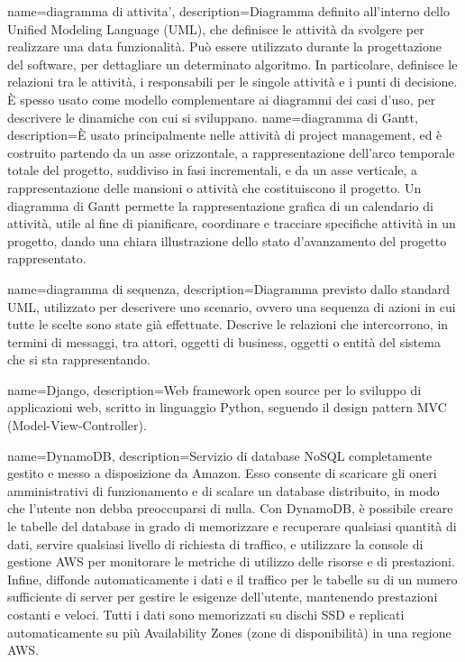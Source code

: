 {
	name=diagramma di attivita',
	description={Diagramma definito all'interno dello Unified Modeling Language (UML), che definisce le attività da svolgere per realizzare una data funzionalità. Può essere utilizzato durante la progettazione del software, per dettagliare un determinato algoritmo. In particolare, definisce le relazioni tra le attività, i responsabili per le singole attività e i punti di decisione. \MakeUppercase{è} spesso usato come modello complementare ai diagrammi dei casi d'uso, per descrivere le dinamiche con cui si sviluppano.}
}
{
	name=diagramma di Gantt,
	description={\MakeUppercase{è} usato principalmente nelle attività di project management, ed è costruito partendo da un asse orizzontale, a rappresentazione dell'arco temporale totale del progetto, suddiviso in fasi incrementali, e da un asse verticale, a rappresentazione delle mansioni o attività che costituiscono il progetto. Un diagramma di Gantt permette la rappresentazione grafica di un calendario di attività, utile al fine di pianificare, coordinare e tracciare specifiche attività in un progetto, dando una chiara illustrazione dello stato d'avanzamento del progetto rappresentato.}
}

{
	name=diagramma di sequenza,
	description={Diagramma previsto dallo standard UML, utilizzato per descrivere uno scenario, ovvero una sequenza di azioni in cui tutte le scelte sono state già effettuate. Descrive le relazioni che intercorrono, in termini di messaggi, tra attori, oggetti di business, oggetti o entità del sistema che si sta rappresentando.}
}

{
	name=Django,
	description={Web framework open source per lo sviluppo di applicazioni web, scritto in linguaggio Python, seguendo il design pattern MVC (Model-View-Controller).}
}

{
	name=DynamoDB,
	description={Servizio di database NoSQL completamente gestito e messo a disposizione da Amazon. Esso consente di scaricare gli oneri amministrativi di funzionamento e di scalare un database distribuito, in modo che l'utente non debba preoccuparsi di nulla.
	Con DynamoDB, è possibile creare le tabelle del database in grado di memorizzare e recuperare qualsiasi quantità di dati, servire qualsiasi livello di richiesta di traffico, e utilizzare la console di gestione AWS per monitorare le metriche di utilizzo delle risorse e di prestazioni. Infine, diffonde automaticamente i dati e il traffico per le tabelle su di un numero sufficiente di server per gestire le esigenze dell'utente, mantenendo prestazioni costanti e veloci. Tutti i dati sono memorizzati su dischi SSD e replicati automaticamente su più Availability Zones (zone di disponibilità) in una regione AWS.}
}
